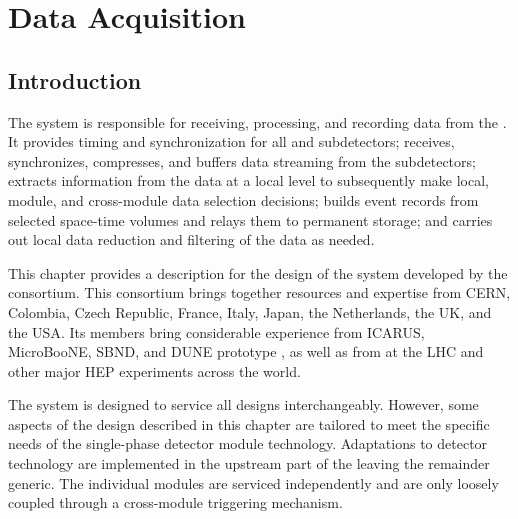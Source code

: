 \chapter{Data Acquisition}
\label{ch:sp-daq}

\section{Introduction}
\label{sec:fd-daq:introduction}

The   system is responsible for receiving,
processing, and recording data from the  .
It provides
timing and synchronization for all  and
subdetectors; receives, synchronizes, compresses, and buffers data
streaming from the subdetectors; extracts information from the data at a
local level to subsequently make local, module, and cross-module data
selection decisions; builds event records %
 from selected space-time volumes 
and relays them to permanent storage; and carries out local data
reduction and filtering of the data as needed.

This chapter provides a description for the design of the 
  system developed by the  
 consortium. 
This consortium brings together resources and expertise from CERN,
Colombia, Czech Republic, France, Italy, Japan, the Netherlands, the UK, and the USA. 
Its members bring considerable experience from ICARUS, MicroBooNE,
SBND, and
DUNE prototype , as well as from  at the LHC and other major
HEP experiments across the world.

The system is designed to service all   designs
interchangeably.  However, some aspects of the  design described in
this chapter are tailored to meet the specific needs of the single-phase
detector module technology.  Adaptations to detector technology are
implemented in the upstream part of the  leaving the remainder generic. The
individual modules are serviced independently and are only loosely
coupled through a cross-module triggering mechanism.

